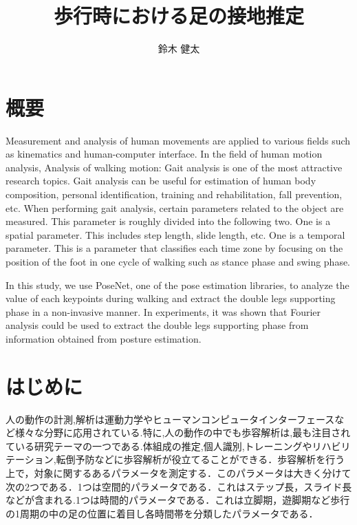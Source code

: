 \documentclass[a4j]{cis-resume}
\title{歩行時における足の接地推定} %
\author{鈴木 健太} %
\begin{document}
\maketitle




\section*{概要}
Measurement and analysis of human movements are applied to various fields such as kinematics and human-computer interface. In the field of human motion analysis, Analysis of walking motion: Gait analysis is one of the most attractive research topics. Gait analysis can be useful for estimation of human body composition, personal identification, training and rehabilitation, fall prevention, etc. When performing gait analysis, certain parameters related to the object are measured. This parameter is roughly divided into the following two. One is a spatial parameter. This includes step length, slide length, etc. One is a temporal parameter. This is a parameter that classifies each time zone by focusing on the position of the foot in one cycle of walking such as stance phase and swing phase.

In this study, we use PoseNet, one of the pose estimation libraries, to analyze the value of each keypoints during walking and extract the double legs supporting phase in a non-invasive manner. In experiments, it was shown that Fourier analysis could be used to extract the double legs supporting phase from information obtained from posture estimation.

\section{はじめに} \label{sec:introduction}
人の動作の計測,解析は運動力学やヒューマンコンピュータインターフェースなど様々な分野に応用されている.特に,人の動作の中でも歩容解析は,最も注目されている研究テーマの一つである.体組成の推定\cite{cite1},個人識別,トレーニングやリハビリテーション,転倒予防などに歩容解析が役立てることができる．歩容解析を行う上で，対象に関するあるパラメータを測定する．このパラメータは大きく分けて次の2つである．1つは空間的パラメータである．これはステップ長，スライド長などが含まれる.1つは時間的パラメータである．これは立脚期，遊脚期\cite{cite2}など歩行の1周期の中の足の位置に着目し各時間帯を分類したパラメータである．
\end{document}
